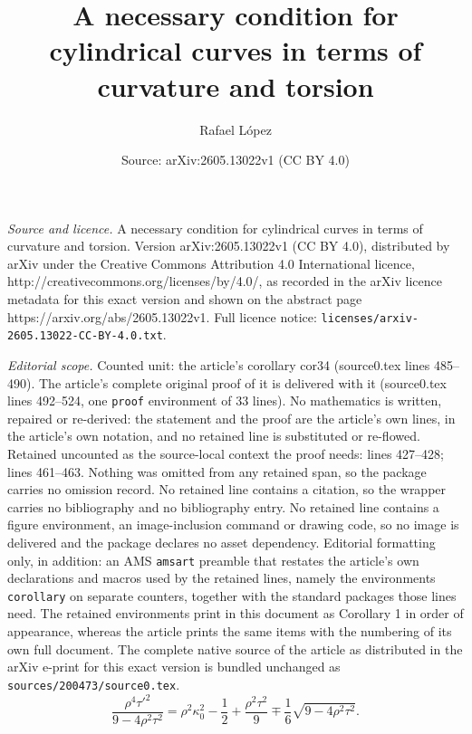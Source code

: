 \documentclass[10pt,a4paper]{amsart}
\title{A necessary condition for cylindrical curves in terms of curvature and torsion}
\author{Rafael L\'opez}
\date{Source: arXiv:2605.13022v1 (CC BY 4.0)}
\begin{document}
\maketitle

\noindent\emph{Source and licence.} A necessary condition for cylindrical curves in terms of curvature and torsion. Version arXiv:2605.13022v1 (CC BY 4.0), distributed by arXiv under the Creative Commons Attribution 4.0 International licence, http://creativecommons.org/licenses/by/4.0/, as recorded in the arXiv licence metadata for this exact version and shown on the abstract page https://arxiv.org/abs/2605.13022v1. Full licence notice: \texttt{licenses/arxiv-2605.13022-CC-BY-4.0.txt}.\par\smallskip

\noindent\textit{Editorial scope.} Counted unit: the article's corollary cor34 (source0.tex lines 485--490). The article's complete original proof of it is delivered with it (source0.tex lines 492--524, one \texttt{proof} environment of 33 lines). No mathematics is written, repaired or re-derived: the statement and the proof are the article's own lines, in the article's own notation, and no retained line is substituted or re-flowed.  Retained uncounted as the source-local context the proof needs: lines 427--428; lines 461--463.  Nothing was omitted from any retained span, so the package carries no omission record.  No retained line contains a citation, so the wrapper carries no bibliography and no bibliography entry.  No retained line contains a figure environment, an image-inclusion command or drawing code, so no image is delivered and the package declares no asset dependency.  Editorial formatting only, in addition: an AMS \texttt{amsart} preamble that restates the article's own declarations and macros used by the retained lines, namely the environments \texttt{corollary} on separate counters, together with the standard packages those lines need.  The retained environments print in this document as Corollary 1 in order of appearance, whereas the article prints the same items with the numbering of its own full document.  The complete native source of the article as distributed in the arXiv e-print for this exact version is bundled unchanged as \texttt{sources/200473/source0.tex}.
\begin{equation}\label{eqs}
 \frac{\rho^4 \tau'^2}{9 - 4\rho^2\tau^2} = \rho^2\kappa_0^2 - \frac{1}{2} + \frac{\rho^2\tau^2}{9} \mp \frac{1}{6}\sqrt{9 - 4\rho^2\tau^2}. \end{equation}
\end{document}

